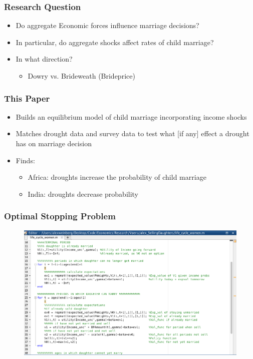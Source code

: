 \documentclass{beamer}
\begin{document}
\begin{frame}
\frametitle{Research Question}

\begin{itemize}
\item Do aggregate Economic forces influence marriage decisions?
\item In particular, do aggregate shocks affect rates of child marriage?
\item In what direction?
  \begin{itemize}
  \item Dowry vs. Brideweath (Brideprice)
  \end{itemize}

\end{itemize}

\end{frame}

\begin{frame}
\frametitle{This Paper}

\begin{itemize}
  \item Builds an equilibrium model of child marriage incorporating income shocks
  \item Matches drought data and survey data to test what [if any] effect a drought has on marriage decision
  \item Finds:
    \begin{itemize}
    \item Africa: droughts increase the probability of child marriage
    \item India: droughts decrease probability
    \end{itemize}
\end{itemize}
\end{frame}

\begin{frame}
  \frametitle{Optimal Stopping Problem}
  \begin{figure}
  \includegraphics[width=1.0\linewidth]{code.png}
  \end{figure}
\end{frame}
\end{document}

